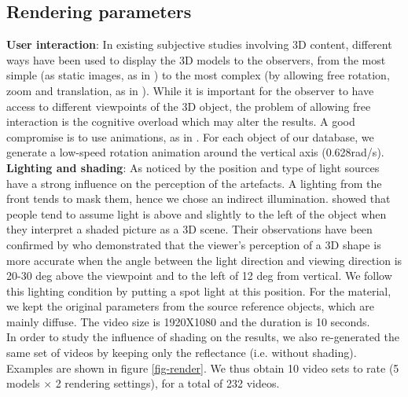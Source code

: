\subsection{Rendering parameters}
\noindent\textbf{User interaction}:
In existing subjective studies involving 3D content, different ways have been used to display the 3D models to the observers, from the most simple (as static images, as in \cite{Watson2001}) to the most complex (by allowing free rotation, zoom and translation, as in \cite{Corsini2007}). While it is important for the observer to have access to different viewpoints of the 3D object, the problem of allowing free interaction is the cognitive overload which may alter the results. A good compromise is to use animations, as in \cite{Pan2005}. For each object of our database, we generate a low-speed rotation animation around the vertical axis (0.628rad/s).\\
\noindent\textbf{Lighting and shading}:
As noticed by \citet{Rogowitz2001} the position and type of light sources have a strong influence on the perception of the artefacts. A lighting from the front tends to mask them, hence we chose an indirect illumination. \citet{Sun1998} showed that people tend to assume light is above and slightly to the left of the object when they interpret a shaded picture as a 3D scene. Their observations have been confirmed by \citet{O'Shea2008} who demonstrated that the viewer’s perception of a 3D shape is more accurate when the angle between the light direction and viewing direction is 20-30 deg above the viewpoint and to the left of 12 deg from vertical. We follow this lighting condition by putting a spot light at this position. For the material, we kept the original parameters from the source reference objects, which are mainly diffuse. The video size is 1920X1080 and the duration is 10 seconds.\\
In order to study the influence of shading on the results, we also re-generated the same set of videos by keeping only the reflectance (i.e. without shading). Examples are shown in figure \ref{fig-render}. We thus obtain 10 video sets to rate (5 models $\times$ 2 rendering settings), for a total of 232 videos.  
